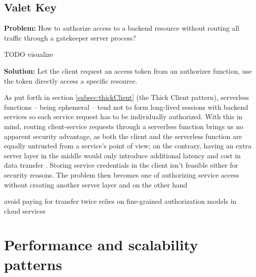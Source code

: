 \subsection{Valet Key} \label{subsec:valetKey}

\textbf{Problem:} How to authorize access to a backend resource without routing all traffic through a gatekeeper server process?

TODO visualize

\textbf{Solution:} Let the client request an access token from an authorizer function, use the token directly access a specific resource.

As put forth in section \ref{subsec:thickClient} (the Thick Client pattern), serverless functions -- being ephemeral -- tend not to form long-lived sessions with backend services so each service request has to be individually authorized. With this in mind, routing client-service requests through a serverless function brings us no apparent security advantage, as both the client and the serverless function are equally untrusted from a service's point of view; on the contrary, having an extra server layer in the middle would only introduce additional latency and cost in data transfer \parencite{adzic2017serverless}. Storing service credentials in the client isn't feasible either for security reasons.
The problem then becomes one of authorizing service access without creating another server layer and on the other hand



avoid paying for transfer twice
relies on fine-grained authorization models in cloud services



\section{Performance and scalability patterns} \label{sec:perfPatterns}

